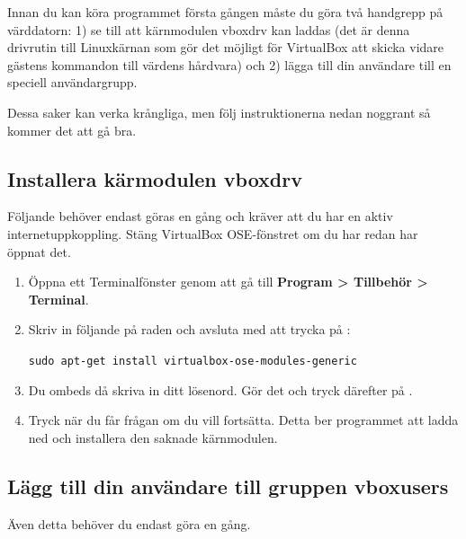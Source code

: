 \documentclass[a4paper,final]{memoir} %
\begin{document}
Innan du kan köra programmet första gången måste du göra två handgrepp på värddatorn: 1) se till att kärnmodulen vboxdrv kan laddas (det är denna drivrutin till Linuxkärnan som gör det möjligt för VirtualBox att skicka vidare gästens kommandon till värdens hårdvara) och 2) lägga till din användare till en speciell användargrupp. 

Dessa saker kan verka krångliga, men följ instruktionerna nedan noggrant så kommer det att gå bra.

\subsection{Installera kärmodulen vboxdrv}


Följande behöver endast göras en gång och kräver att du har en aktiv internetuppkoppling. Stäng VirtualBox OSE-fönstret om du har redan har öppnat det.

\begin{enumerate}

\item Öppna ett Terminalfönster genom att gå till \textbf{Program \textgreater{} Tillbehör \textgreater{} Terminal}.

\item Skriv in följande på raden och avsluta med att trycka på :

\texttt{\small sudo apt-get install virtualbox-ose-modules-generic}

\item Du ombeds då skriva in ditt lösenord. Gör det och tryck därefter på . 

\item Tryck  när du får frågan om du vill fortsätta. Detta ber programmet  att ladda ned och installera den saknade kärnmodulen.

\end{enumerate}


\subsection{Lägg till din användare till gruppen vboxusers}

Även detta behöver du endast göra en gång.
\end{document}
